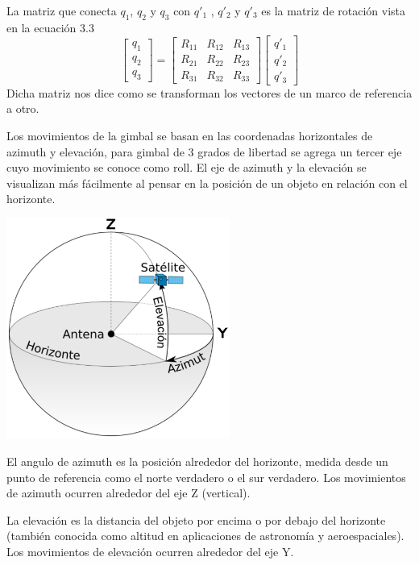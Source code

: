 La matriz que conecta $q_1$, $q_2$ y $q_3$ con $q'_1$ , $q'_2$ y $q'_3$ es la matriz de
rotación vista en la ecuación 3.3
\begin{equation}
	\begin{bmatrix}
		q_1 \\
		q_2 \\
		q_3
	\end{bmatrix}
	=
	\begin{bmatrix}
		R_{11} & R_{12} & R_{13} \\
		R_{21} & R_{22} & R_{23} \\
		R_{31} & R_{32} & R_{33}
	\end{bmatrix}
	\begin{bmatrix}
		q'_1 \\
		q'_2 \\
		q'_3
	\end{bmatrix}
\end{equation}
Dicha matriz nos dice como se transforman los vectores de un marco de referencia a otro.

Los movimientos de la gimbal se basan en las coordenadas horizontales de azimuth y elevación, para gimbal de 3 grados de libertad
se agrega un tercer eje cuyo movimiento se conoce como roll. El eje de azimuth y la elevación se visualizan más fácilmente al
pensar en la posición de un objeto en relación con el horizonte.
\begin{center}
	\includegraphics[width=0.55\textwidth]{Contenido/Cuerpo/Capitulo3/Fig1.eps}
	\label{fig:ModeloMat:Fig1}
\end{center}
El angulo de azimuth es la posición alrededor del horizonte, medida desde un punto de referencia como el norte verdadero o el sur
verdadero. Los movimientos de azimuth ocurren alrededor del eje Z (vertical).

La elevación es la distancia del objeto por encima o por debajo del horizonte (también conocida como altitud en aplicaciones de
astronomía y aeroespaciales). Los movimientos de elevación ocurren alrededor del eje Y.

